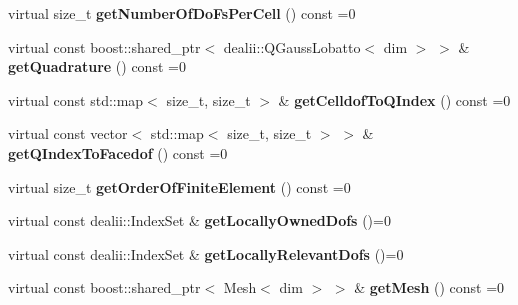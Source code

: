 \begin{DoxyCompactItemize}
\item 
\hypertarget{classnatrium_1_1AdvectionOperator_ac452ae3240fa37df817c7e294f71315e}{
virtual size\_\-t {\bfseries getNumberOfDoFsPerCell} () const =0}
\label{classnatrium_1_1AdvectionOperator_ac452ae3240fa37df817c7e294f71315e}

\item 
\hypertarget{classnatrium_1_1AdvectionOperator_adf5b566df5abc5ad2afa8977e83bb518}{
virtual const boost::shared\_\-ptr$<$ dealii::QGaussLobatto$<$ dim $>$ $>$ \& {\bfseries getQuadrature} () const =0}
\label{classnatrium_1_1AdvectionOperator_adf5b566df5abc5ad2afa8977e83bb518}

\item 
\hypertarget{classnatrium_1_1AdvectionOperator_a88232d5ef52ce0db77133682e26a5760}{
virtual const std::map$<$ size\_\-t, size\_\-t $>$ \& {\bfseries getCelldofToQIndex} () const =0}
\label{classnatrium_1_1AdvectionOperator_a88232d5ef52ce0db77133682e26a5760}

\item 
\hypertarget{classnatrium_1_1AdvectionOperator_a09b59c91618b2a8d55a98ccc0fd33d36}{
virtual const vector$<$ std::map$<$ size\_\-t, size\_\-t $>$ $>$ \& {\bfseries getQIndexToFacedof} () const =0}
\label{classnatrium_1_1AdvectionOperator_a09b59c91618b2a8d55a98ccc0fd33d36}

\item 
\hypertarget{classnatrium_1_1AdvectionOperator_afedb20e8eac67980523f64e446f8bbe9}{
virtual size\_\-t {\bfseries getOrderOfFiniteElement} () const =0}
\label{classnatrium_1_1AdvectionOperator_afedb20e8eac67980523f64e446f8bbe9}

\item 
\hypertarget{classnatrium_1_1AdvectionOperator_aac798ab3b6259b3b3b1e21c5cddac05b}{
virtual const dealii::IndexSet \& {\bfseries getLocallyOwnedDofs} ()=0}
\label{classnatrium_1_1AdvectionOperator_aac798ab3b6259b3b3b1e21c5cddac05b}

\item 
\hypertarget{classnatrium_1_1AdvectionOperator_a3011d32ffb48a1e5b5aef470a4440f0b}{
virtual const dealii::IndexSet \& {\bfseries getLocallyRelevantDofs} ()=0}
\label{classnatrium_1_1AdvectionOperator_a3011d32ffb48a1e5b5aef470a4440f0b}

\item 
\hypertarget{classnatrium_1_1AdvectionOperator_a67fddd527b5f2b9f19f663284e6954bc}{
virtual const boost::shared\_\-ptr$<$ Mesh$<$ dim $>$ $>$ \& {\bfseries getMesh} () const =0}
\label{classnatrium_1_1AdvectionOperator_a67fddd527b5f2b9f19f663284e6954bc}


\end{DoxyCompactItemize}
